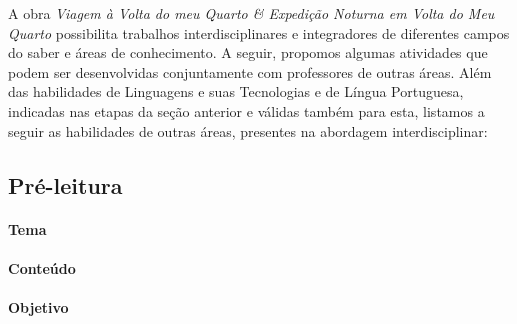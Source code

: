 \documentclass[12pt]{extarticle}
\begin{document}
A obra \emph{Viagem à Volta do meu Quarto \& Expedição Noturna em Volta
do Meu Quarto} possibilita trabalhos interdisciplinares e integradores
de diferentes campos do saber e áreas de conhecimento. A seguir,
propomos algumas atividades que podem ser desenvolvidas conjuntamente
com professores de outras áreas. Além das habilidades de Linguagens e
suas Tecnologias e de Língua Portuguesa, indicadas nas etapas da seção
anterior e válidas também para esta, listamos a seguir as habilidades de
outras áreas, presentes na abordagem interdisciplinar:

\subsection{Pré-leitura}


\paragraph{Tema}

\paragraph{Conteúdo}

\paragraph{Objetivo}
\end{document}
